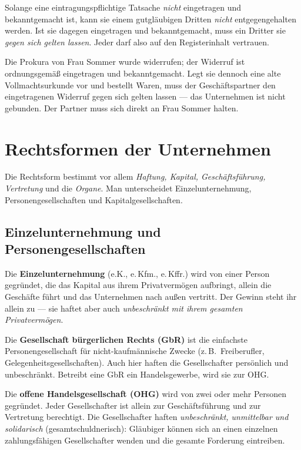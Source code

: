 \documentclass[11pt, a4paper]{article}
\begin{document}
\begin{merksatz}
Solange eine eintragungspflichtige Tatsache \emph{nicht} eingetragen und bekanntgemacht
ist, kann sie einem gutgläubigen Dritten \emph{nicht} entgegengehalten werden. Ist sie
dagegen eingetragen und bekanntgemacht, muss ein Dritter sie \emph{gegen sich gelten
lassen}. Jeder darf also auf den Registerinhalt vertrauen.
\end{merksatz}

\begin{beispiel}
Die Prokura von Frau Sommer wurde widerrufen; der Widerruf ist ordnungsgemäß eingetragen
und bekanntgemacht. Legt sie dennoch eine alte Vollmachtsurkunde vor und bestellt Waren,
muss der Geschäftspartner den eingetragenen Widerruf gegen sich gelten lassen --- das
Unternehmen ist nicht gebunden. Der Partner muss sich direkt an Frau Sommer halten.
\end{beispiel}

\section{Rechtsformen der Unternehmen}

Die Rechtsform bestimmt vor allem \emph{Haftung, Kapital, Geschäftsführung, Vertretung}
und die \emph{Organe}. Man unterscheidet Einzelunternehmung, Personengesellschaften und
Kapitalgesellschaften.

\subsection{Einzelunternehmung und Personengesellschaften}

Die \textbf{Einzelunternehmung} (e.K., e.\,Kfm., e.\,Kffr.) wird von einer Person
gegründet, die das Kapital aus ihrem Privatvermögen aufbringt, allein die Geschäfte führt
und das Unternehmen nach außen vertritt. Der Gewinn steht ihr allein zu --- sie haftet
aber auch \emph{unbeschränkt mit ihrem gesamten Privatvermögen}.

Die \textbf{Gesellschaft bürgerlichen Rechts (GbR)} ist die einfachste Personen\-gesellschaft
für nicht-kaufmännische Zwecke (z.\,B.\ Freiberufler, Gelegenheitsgesellschaften). Auch
hier haften die Gesellschafter persönlich und unbeschränkt. Betreibt eine GbR ein
Handelsgewerbe, wird sie zur OHG.

Die \textbf{offene Handelsgesellschaft (OHG)} wird von zwei oder mehr Personen gegründet.
Jeder Gesellschafter ist allein zur Geschäftsführung und zur Vertretung berechtigt. Die
Gesellschafter haften \emph{unbeschränkt, unmittelbar und solidarisch} (gesamt\-schuld\-nerisch):
Gläubiger können sich an einen einzelnen zahlungsfähigen Gesellschafter wenden und die
gesamte Forderung eintreiben.
\end{document}
